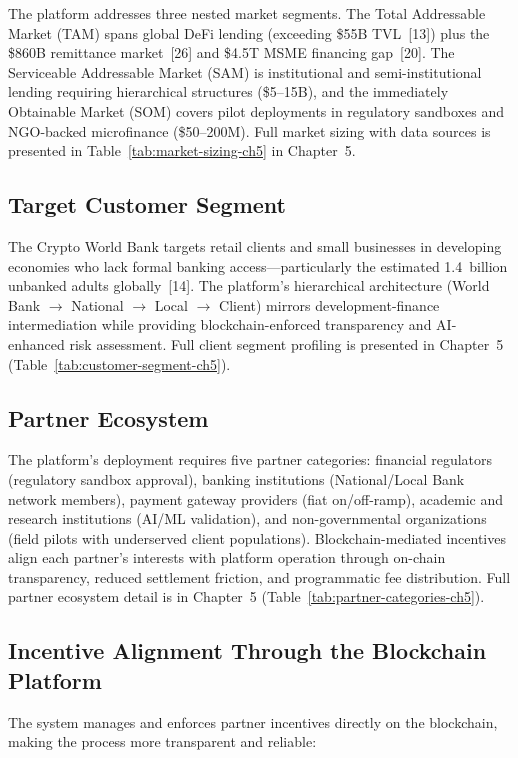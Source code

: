 \documentclass[12pt,a4paper]{report}
\begin{document}
The platform addresses three nested market segments. The Total Addressable Market (TAM) spans global DeFi lending (exceeding \$55B TVL~[13]) plus the \$860B remittance market~[26] and \$4.5T MSME financing gap~[20]. The Serviceable Addressable Market (SAM) is institutional and semi-institutional lending requiring hierarchical structures (\$5--15B), and the immediately Obtainable Market (SOM) covers pilot deployments in regulatory sandboxes and NGO-backed microfinance (\$50--200M). Full market sizing with data sources is presented in Table~\ref{tab:market-sizing-ch5} in Chapter~5.

\subsection{Target Customer Segment}

The Crypto World Bank targets retail clients and small businesses in developing economies who lack formal banking access---particularly the estimated 1.4~billion unbanked adults globally~[14]. The platform's hierarchical architecture (World Bank $\to$ National $\to$ Local $\to$ Client) mirrors development-finance intermediation while providing blockchain-enforced transparency and AI-enhanced risk assessment. Full client segment profiling is presented in Chapter~5 (Table~\ref{tab:customer-segment-ch5}).

\subsection{Partner Ecosystem}

The platform's deployment requires five partner categories: financial regulators (regulatory sandbox approval), banking institutions (National/Local Bank network members), payment gateway providers (fiat on/off-ramp), academic and research institutions (AI/ML validation), and non-governmental organizations (field pilots with underserved client populations). Blockchain-mediated incentives align each partner's interests with platform operation through on-chain transparency, reduced settlement friction, and programmatic fee distribution. Full partner ecosystem detail is in Chapter~5 (Table~\ref{tab:partner-categories-ch5}).

\subsection{Incentive Alignment Through the Blockchain Platform}

The system manages and enforces partner incentives directly on the blockchain, making the process more transparent and reliable:
\end{document}

